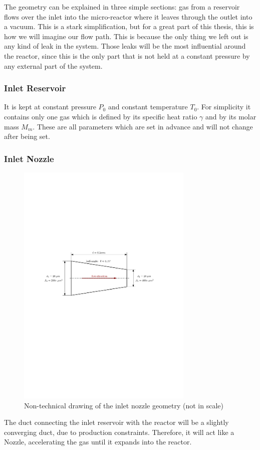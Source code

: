 	The geometry can be explained in three simple sections: gas from a reservoir flows over the inlet into the micro-reactor where it leaves through the outlet into a vacuum. 
	This is a stark simplification, but for a great part of this thesis, this is how we will imagine our flow path.
	This is because the only thing we left out is any kind of leak in the system.
	Those leaks will be the most influential around the reactor, since this is the only part that is not held at a constant pressure by any external part of the system.\\
\subsubsection*{Inlet Reservoir}

	It is kept at constant pressure \(P_0\) and constant temperature \(T_0\).
	For simplicity it contains only one gas which is defined by its specific heat ratio \(\gamma\) and by its molar mass \(M_m\).
	These are all parameters which are set in advance and will not change after being set.
	
\subsubsection*{Inlet Nozzle}

	\begin{figure}[H]
	    \centering
	    \includegraphics[width=0.75\textwidth]{src/03_analytical-work/fig_inlet-nozzle-geometry.pdf}
	    \caption{Non-technical drawing of the inlet nozzle geometry (not in scale)}
	    \label{fig:geometry-inlet-nozzle}
	\end{figure}
	The duct connecting the inlet reservoir with the reactor will be a slightly converging duct, due to production constraints.
	Therefore, it will act like a Nozzle, accelerating the gas until it expands into the reactor.
	
